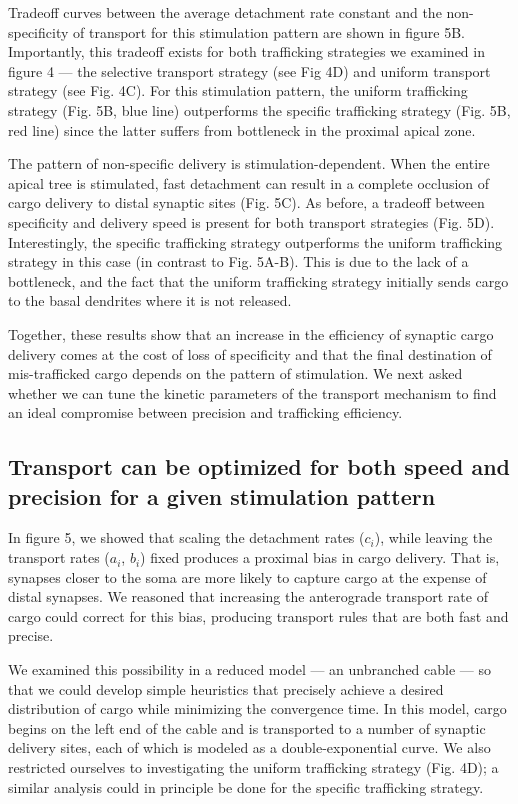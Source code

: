 \documentclass[11pt]{wlpeerj}
\begin{document}
Tradeoff curves between the average detachment rate constant and the non-specificity of transport for this stimulation pattern are shown in figure 5B.
Importantly, this tradeoff exists for both trafficking strategies we examined in figure 4 --- the selective transport strategy (see Fig 4D) and uniform transport strategy (see Fig. 4C).
For this stimulation pattern, the uniform trafficking strategy (Fig. 5B, blue line) outperforms the specific trafficking strategy (Fig. 5B, red line) since the latter suffers from bottleneck in the proximal apical zone.

The pattern of non-specific delivery is stimulation-dependent.
When the entire apical tree is stimulated, fast detachment can result in a complete occlusion of cargo delivery to distal synaptic sites (Fig. 5C).
As before, a tradeoff between specificity and delivery speed is present for both transport strategies (Fig. 5D).
Interestingly, the specific trafficking strategy outperforms the uniform trafficking strategy in this case (in contrast to Fig. 5A-B).
This is due to the lack of a bottleneck, and the fact that the uniform trafficking strategy initially sends cargo to the basal dendrites where it is not released.

Together, these results show that an increase in the efficiency of synaptic cargo delivery comes at the cost of loss of specificity and that the final destination of mis-trafficked cargo depends on the pattern of stimulation.
We next asked whether we can tune the kinetic parameters of the transport mechanism to find an ideal compromise between precision and trafficking efficiency.

\subsection*{Transport can be optimized for both speed and precision for a given stimulation pattern}

In figure 5, we showed that scaling the detachment rates ($c_i$), while leaving the transport rates ($a_i$, $b_i$) fixed produces a proximal bias in cargo delivery.
That is, synapses closer to the soma are more likely to capture cargo at the expense of distal synapses.
We reasoned that increasing the anterograde transport rate of cargo could correct for this bias, producing transport rules that are both fast and precise.

We examined this possibility in a reduced model --- an unbranched cable --- so that we could develop simple heuristics that precisely achieve a desired distribution of cargo while minimizing the convergence time.
In this model, cargo begins on the left end of the cable and is transported to a number of synaptic delivery sites, each of which is modeled as a double-exponential curve.
We also restricted ourselves to investigating the uniform trafficking strategy (Fig. 4D); a similar analysis could in principle be done for the specific trafficking strategy.
\end{document}
